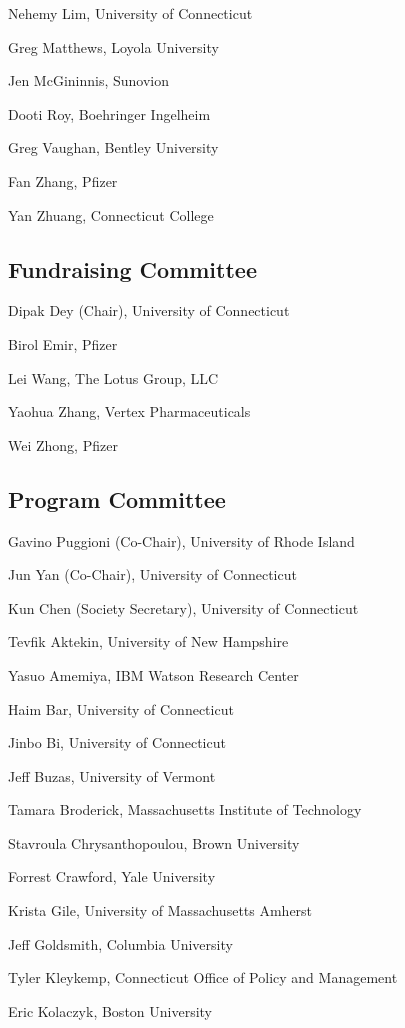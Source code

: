 \documentclass[10pt]{article}
\begin{document}
{Nehemy Lim, University of Connecticut

Greg Matthews, Loyola University

Jen McGininnis, Sunovion

Dooti Roy, Boehringer Ingelheim

Greg Vaughan, Bentley University

Fan Zhang, Pfizer

Yan Zhuang, Connecticut College

\subsection*{Fundraising Committee}

Dipak Dey (Chair), University of Connecticut

Birol Emir, Pfizer

Lei Wang, The Lotus Group, LLC

Yaohua Zhang, Vertex Pharmaceuticals

Wei Zhong, Pfizer

\subsection*{Program Committee}

Gavino Puggioni (Co-Chair), University of Rhode Island

Jun Yan (Co-Chair), University of Connecticut

Kun Chen (Society Secretary), University of Connecticut

\bigskip

Tevfik Aktekin, University of New Hampshire

Yasuo Amemiya, IBM Watson Research Center

Haim Bar, University of Connecticut

Jinbo Bi, University of Connecticut

Jeff Buzas, University of Vermont

Tamara Broderick, Massachusetts Institute of Technology

Stavroula Chrysanthopoulou, Brown University

Forrest Crawford, Yale University

Krista Gile, University of Massachusetts Amherst

Jeff Goldsmith, Columbia University

Tyler Kleykemp, Connecticut Office of Policy and Management

Eric Kolaczyk, Boston University

}
\end{document}
